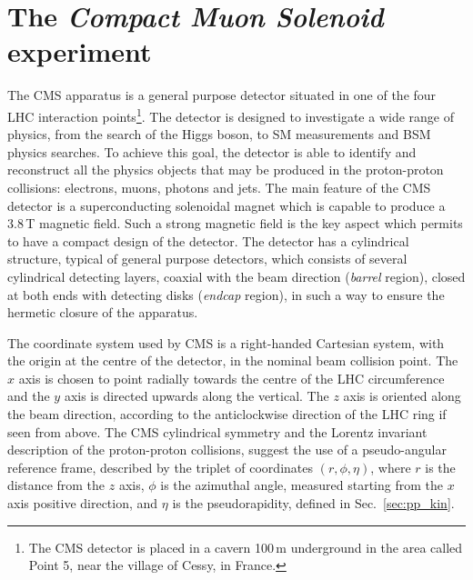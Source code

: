 \section{The \emph{Compact Muon Solenoid} experiment}
\label{sec:CMS}

The CMS apparatus is a general purpose detector situated in one of the four LHC interaction points\footnote{The CMS detector is placed in a cavern 100\,m underground in the area called Point 5, near the village of Cessy, in France.}. The detector is designed to investigate a wide range of physics, from the search of the Higgs boson, to SM measurements and BSM physics searches. To achieve this goal, the detector is able to identify and reconstruct all the physics objects that may be produced in the proton-proton collisions: electrons, muons, photons and jets. The main feature of the CMS detector is a superconducting solenoidal magnet which is capable to produce a $3.8$\,T magnetic field. Such a strong magnetic field is the key aspect which permits to have a compact design of the detector. The detector has a cylindrical structure, typical of general purpose detectors, which consists of several cylindrical detecting layers, coaxial with the beam direction (\emph{barrel} region), closed at both ends with detecting disks (\emph{endcap} region), in such a way to ensure the hermetic closure of the apparatus.

The coordinate system used by CMS is a right-handed Cartesian system, with the origin at the centre of the detector, in the nominal beam collision point. The $x$ axis is chosen to point radially towards the centre of the LHC circumference and the $y$ axis is directed upwards along the vertical. The $z$ axis is oriented along the beam direction, according to the anticlockwise direction of the LHC ring if seen from above. The CMS cylindrical symmetry and the Lorentz invariant description of the proton-proton collisions, suggest the use of a pseudo-angular reference frame, described by the triplet of coordinates $(r,\phi,\eta)$, where $r$ is the distance from the $z$ axis, $\phi$ is the azimuthal angle, measured starting from the $x$ axis positive direction, and $\eta$ is the pseudorapidity, defined in Sec.~\ref{sec:pp_kin}.

